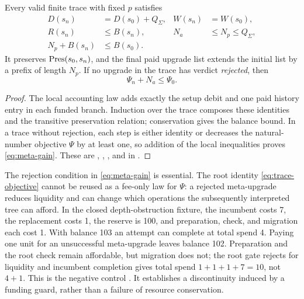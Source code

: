 \begin{theorem}\label{thm:meta-closure}
Every valid finite trace with fixed $p$ satisfies
\begin{align}
 D(s_n)&=D(s_0)+Q_\Sigma,& W(s_n)&=W(s_0),\\
 R(s_n)&\le B(s_n),& N_a&\le N_p\le Q_\Sigma,\\
 N_p+B(s_n)&\le B(s_0).
\end{align}
It preserves $\operatorname{Pres}(s_0,s_n)$, and the final paid upgrade list extends the initial list by a prefix of length $N_p$. If no upgrade in the trace has verdict \emph{rejected}, then
\begin{equation}\label{eq:meta-gain}
 \Psi_n+N_a\le\Psi_0.
\end{equation}
\end{theorem}
\begin{proof}
The local accounting law adds exactly the setup debit and one paid history entry in each funded branch. Induction over the trace composes these identities and the transitive preservation relation; conservation gives the balance bound. In a trace without rejection, each step is either identity or decreases the natural-number objective $\Psi$ by at least one, so addition of the local inequalities proves \eqref{eq:meta-gain}. These are , , , and  in .
\end{proof}

The rejection condition in \eqref{eq:meta-gain} is essential. The root identity \eqref{eq:trace-objective} cannot be reused as a fee-only law for $\Psi$: a rejected meta-upgrade reduces liquidity and can change which operations the subsequently interpreted tree can afford. In the closed depth-obstruction fixture, the incumbent costs 7, the replacement costs 1, the reserve is 100, and preparation, check, and migration each cost 1. With balance 103 an attempt can complete at total spend 4. Paying one unit for an unsuccessful meta-upgrade leaves balance 102. Preparation and the root check remain affordable, but migration does not; the root gate rejects for liquidity and incumbent completion gives total spend $1+1+1+7=10$, not $4+1$. This is the negative control . It establishes a discontinuity induced by a funding guard, rather than a failure of resource conservation.

